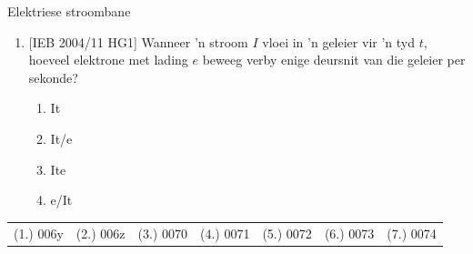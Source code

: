 \begin{eocexercises}{Elektriese stroombane}
\begin{enumerate}[noitemsep, label=\textbf{\arabic*}. ]
{}

\item{[IEB 2004/11 HG1] Wanneer  'n stroom $I$ vloei in  'n geleier vir
 'n tyd $t$, hoeveel elektrone met lading $e$ beweeg verby enige deursnit van die
geleier per sekonde?
\begin{enumerate}[noitemsep, label=\textbf{\alph*}. ] 
\item{It}
\item{It/e}
\item{Ite}
\item{e/It}
\end{enumerate}}

\end{enumerate}
\par \practiceinfo
 \par \begin{tabular}[h]{cccccc}
 (1.) 006y  &  (2.) 006z  &  (3.) 0070  &  (4.) 0071  &  (5.) 0072  &  (6.) 0073  &  (7.) 0074   \end{tabular}
\end{eocexercises}

